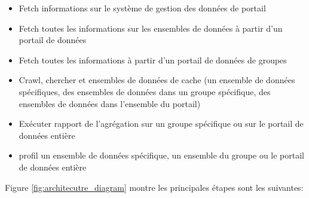 \documentclass[a4paper,11pt,twoside]{ThesisStyle}
\begin{document}
\begin{itemize}
	\item Fetch informations sur le système de gestion des données de portail
	\item Fetch toutes les informations sur les ensembles de données à partir d'un portail de données
	\item Fetch toutes les informations à partir d'un portail de données de groupes
	\item Crawl, chercher et ensembles de données de cache (un ensemble de données spécifiques, des ensembles de données dans un groupe spécifique, des ensembles de données dans l'ensemble du portail)
	\item Exécuter rapport de l'agrégation sur un groupe spécifique ou sur le portail de données entière
	\item profil un ensemble de données spécifique, un ensemble du groupe ou le portail de données entière
\end{itemize}

Figure \ref{fig:architecutre_diagram} montre les principales étapes sont les suivantes:
\end{document}
